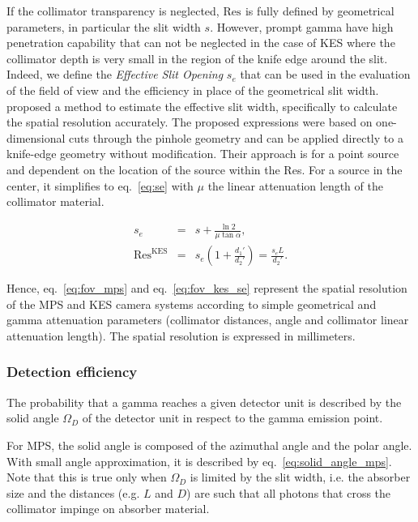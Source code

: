 \documentclass[a4paper,english,12pt]{article}
\newcommand\FOV{\textrm{Res}}
\newcommand\KES{\textrm{KES}}
\newcommand\du{}
\begin{document}
If the collimator transparency is neglected, $\FOV_{\du}$ is fully defined by geometrical parameters, in particular the slit width $s$. However, prompt gamma have high penetration capability that can not be neglected in the case of KES where the collimator depth is very small in the region of the knife edge around the slit. Indeed, we define the \textit{Effective Slit Opening} $s_e$ that can be used in the evaluation of the field of view and the efficiency in place of the geometrical slit width. \cite{Metzler2005}
proposed a method to estimate the effective slit width, specifically to calculate
the spatial resolution accurately. The proposed expressions were based on
one-dimensional cuts through the pinhole geometry and can be applied directly to
a knife-edge geometry without modification. Their approach is for a point source
and dependent on the location of the source within the \FOV. For a source in the
center, it simplifies to eq.~\ref{eq:se} with $\mu$ the linear attenuation
length of the collimator material.

\begin{eqnarray}
  s_e & = & s + \frac{\ln2}{\mu\tan\alpha}   \label{eq:se}, \\
   \FOV_{\du}^{\KES} & = & s_e\left(1+ \frac{d_1'}{d_2'}\right) = \frac{s_eL}{d_2'}.
  \label{eq:fov_kes_se}
\end{eqnarray}

Hence, eq.~\ref{eq:fov_mps} and eq.~\ref{eq:fov_kes_se} represent the spatial resolution of the MPS and KES camera systems according to simple geometrical and gamma attenuation parameters (collimator distances, angle and collimator linear attenuation length). The spatial resolution is expressed in millimeters.

\subsubsection{Detection efficiency}

The probability that a gamma reaches a given detector unit is described by the solid angle $\Omega_D$ of the detector unit in respect to the gamma emission point.

For MPS, the solid angle is composed of the azimuthal angle and the polar angle. With small angle approximation, it is described by eq.~\ref{eq:solid_angle_mps}. Note that this is true only when $\Omega_D$ is limited by the slit width, i.e. the absorber size and the distances (e.g. $L$ and $D$) are such that all photons that cross the collimator impinge on absorber material.
\end{document}
